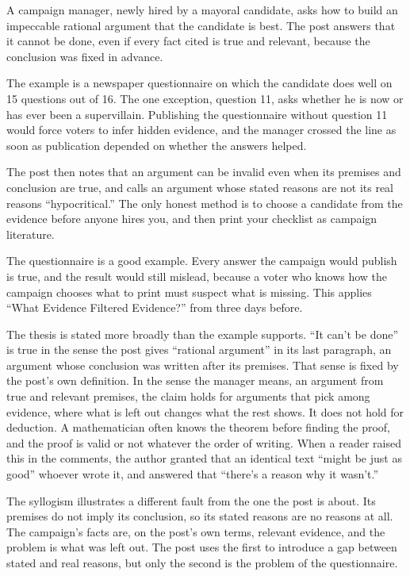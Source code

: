 \begin{afterword}
\summaryhead

A campaign manager, newly hired by a mayoral candidate, asks how to build an impeccable rational argument that the candidate is best. The post answers that it cannot be done, even if every fact cited is true and relevant, because the conclusion was fixed in advance.

The example is a newspaper questionnaire on which the candidate does well on 15 questions out of 16. The one exception, question 11, asks whether he is now or has ever been a supervillain. Publishing the questionnaire without question 11 would force voters to infer hidden evidence, and the manager crossed the line as soon as publication depended on whether the answers helped.

The post then notes that an argument can be invalid even when its premises and conclusion are true, and calls an argument whose stated reasons are not its real reasons ``hypocritical.'' The only honest method is to choose a candidate from the evidence before anyone hires you, and then print your checklist as campaign literature.

\responsehead

The questionnaire is a good example. Every answer the campaign would publish is true, and the result would still mislead, because a voter who knows how the campaign chooses what to print must suspect what is missing. This applies ``What Evidence Filtered Evidence?'' from three days before.

The thesis is stated more broadly than the example supports. ``It can't be done'' is true in the sense the post gives ``rational argument'' in its last paragraph, an argument whose conclusion was written after its premises. That sense is fixed by the post's own definition. In the sense the manager means, an argument from true and relevant premises, the claim holds for arguments that pick among evidence, where what is left out changes what the rest shows. It does not hold for deduction. A mathematician often knows the theorem before finding the proof, and the proof is valid or not whatever the order of writing. When a reader raised this in the comments, the author granted that an identical text ``might be just as good'' whoever wrote it, and answered that ``there's a reason why it wasn't.''

The syllogism illustrates a different fault from the one the post is about. Its premises do not imply its conclusion, so its stated reasons are no reasons at all. The campaign's facts are, on the post's own terms, relevant evidence, and the problem is what was left out. The post uses the first to introduce a gap between stated and real reasons, but only the second is the problem of the questionnaire.


\end{afterword}
